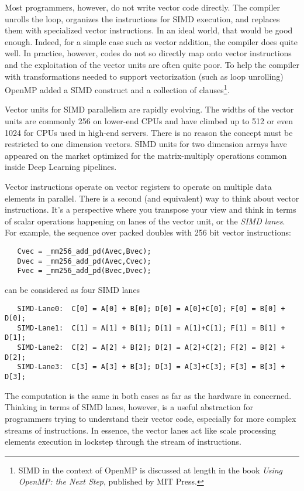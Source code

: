 Most programmers, however, do not write vector code directly.  The compiler unrolls the loop, organizes the instructions for SIMD
execution, and replaces them with specialized vector instructions.  In an ideal world, that would be good enough. Indeed,
for a simple case such as vector addition, the compiler does quite well.  In practice, however, codes do not so directly map
onto vector instructions and the exploitation of the vector units are often quite poor.
To help the compiler with transformations needed to support vectorization (such as loop unrolling) OpenMP added
a SIMD construct and a collection of clauses\footnote{SIMD in the context of OpenMP is discussed at length in the book
\emph{Using OpenMP: the Next Step}, published by MIT Press.}.

Vector units for SIMD parallelism are rapidly evolving.  The widths of the vector units are commonly 256 on lower-end
CPUs and have climbed up to 512 or even 1024 for CPUs used in high-end servers.  There is no reason the concept must 
be restricted to one dimension vectors.   SIMD units for two dimension arrays have appeared on the market optimized
for the matrix-multiply operations common inside Deep Learning pipelines. 

Vector instructions operate on vector registers to operate on multiple data elements in parallel. There is a second (and equivalent)
way to think about vector instructions.   It's a perspective where you transpose your view and think in terms of scalar operations
happening on lanes of the vector unit, or the \emph{SIMD lanes}.   For example, the sequence over packed doubles
with 256 bit vector instructions:
\begin{verbatim}
   Cvec = _mm256_add_pd(Avec,Bvec);
   Dvec = _mm256_add_pd(Avec,Cvec);
   Fvec = _mm256_add_pd(Bvec,Dvec);
\end{verbatim}
can be considered as four SIMD lanes
\begin{verbatim}
   SIMD-Lane0:  C[0] = A[0] + B[0]; D[0] = A[0]+C[0]; F[0] = B[0] + D[0];
   SIMD-Lane1:  C[1] = A[1] + B[1]; D[1] = A[1]+C[1]; F[1] = B[1] + D[1];
   SIMD-Lane2:  C[2] = A[2] + B[2]; D[2] = A[2]+C[2]; F[2] = B[2] + D[2];
   SIMD-Lane3:  C[3] = A[3] + B[3]; D[3] = A[3]+C[3]; F[3] = B[3] + D[3];
\end{verbatim}
The computation is the same in both cases as far as the hardware in concerned.  Thinking in terms
of SIMD lanes, however, is a useful abstraction for programmers trying to understand their vector code,
especially for more complex streams of instructions.  In essence, the vector lanes act like scale processing 
elements execution in lockstep through the stream of instructions.   
   
